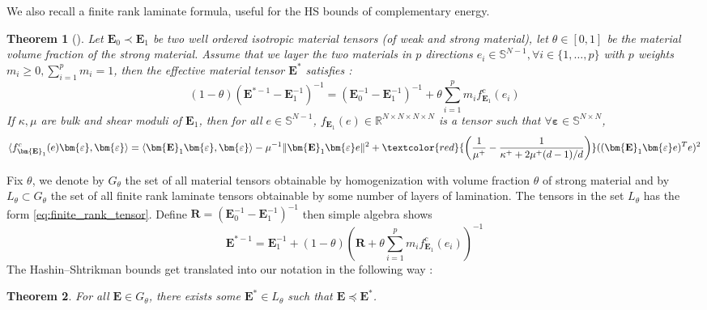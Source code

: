\documentclass[preprint,3p]{elsarticle}
\newcommand{\tenss}[1]{\bm{\mathbf{#1}}}            %
\newcommand{\tensf}[1]{\bm{\mathbf{#1}}}            %
\newcommand{\strain}{\tenss{\varepsilon}}           %
\newcommand{\Estar}{\tensf{E}^{*}}
\newtheorem{theorem}{Theorem}[section]
\begin{document}
We also recall a finite rank laminate formula, useful for the HS bounds of complementary energy.
\begin{theorem}[\cite{allaire1997shape}]\label{thrm:finite_rank_laminate_formula}
    Let $\tensf{E}_0\prec\tensf{E}_1$ be two well ordered isotropic material tensors (of weak and strong material), let $\theta\in[0,1]$ be the material volume fraction of the strong material. Assume that we layer the two materials in $p$ directions $e_i\in\mathbb{S}^{N-1},\forall i\in\{1,\dots,p\}$ with $p$ weights $m_i\geq0,\sum_{i=1}^pm_i=1$, then the effective material tensor $\Estar$ satisfies : \begin{equation}\label{eq:finite_rank_tensor}
        (1-\theta)\left(\tensf{E}^{*-1}-\tensf{E}_1^{-1}\right)^{-1}=\left(\tensf{E}_0^{-1}-\tensf{E}_1^{-1}\right)^{-1}+\theta\sum_{i=1}^pm_i f_{\tensf{E}_1}^c(e_i)
    \end{equation}
    If $\kappa,\mu$ are bulk and shear moduli of $\tensf{E}_1$, then for all $e\in\mathbb{S}^{N-1}$, $f_{\tensf{E}_1}(e)\in\mathbb{R}^{N\times N\times N\times N}$ is a tensor such that $\forall \strain\in\mathbb{S}^{N\times N}$, \begin{equation}\label{eqn:complementary_tensor}
        \langle f_{\tensf{E}_1}^c(e)\strain,\strain\rangle=\langle\tensf{E}_1\strain,\strain\rangle-\mu^{-1}\lVert\tensf{E}_1\strain e\rVert^2+
        \textcolor{red}{\left(\frac{1}{\mu^+} - \frac{1}{\kappa^+ + 2 \mu^+ (d - 1)/d}\right)}
        ((\tensf{E}_1\strain e)^Te)^2
    \end{equation}
\end{theorem}
Fix $\theta$, we denote by $G_\theta$ the set of all material tensors obtainable by homogenization with volume fraction $\theta$ of strong material and by $L_\theta\subset G_\theta$ the set of all finite rank laminate tensors obtainable by some number of layers of lamination. The tensors in the set $L_\theta$ has the form \eqref{eq:finite_rank_tensor}. Define $\tensf{R}=\left(\tensf{E}_0^{-1}-\tensf{E}_1^{-1}\right)^{-1}$ then simple algebra shows \begin{equation}
    \tensf{E}^{*-1}=\tensf{E}_{1}^{-1}+(1-\theta)\left(\tensf{R}+\theta\sum_{i=1}^pm_i f_{\tensf{E}_1}^c(e_i)\right)^{-1}
\end{equation}
The Hashin--Shtrikman bounds get translated into our notation in the following way : \begin{theorem}
    For all $\tensf{E}\in G_\theta$, there exists some $\tensf{E}^*\in L_\theta$ such that $\tensf{E}\preceq \tensf{E}^*$.
\end{theorem}
\end{document}
